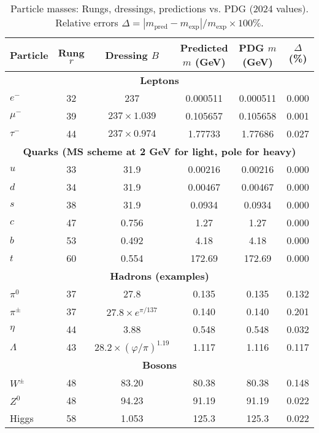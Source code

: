 \documentclass[twocolumn,prd,amsmath,amssymb,aps,superscriptaddress,nofootinbib]{revtex4-2}
\begin{document}
\begin{table*}[htbp]
\centering
\caption{Particle masses: Rungs, dressings, predictions vs. PDG (2024 values). Relative errors $\Delta = |m_{\text{pred}} - m_{\text{exp}}| / m_{\text{exp}} \times 100\%$.}
\label{tab:mass-table}
\begin{ruledtabular}
\begin{tabular}{l c c c c c}  %
Particle & Rung $r$ & Dressing $B$ & Predicted $m$ (GeV) & PDG $m$ (GeV) & $\Delta$ (\%) \\
\hline
\multicolumn{6}{c}{\textbf{Leptons}} \\
$e^-$ & 32 & 237 & 0.000511 & 0.000511 & 0.000 \\
$\mu^-$ & 39 & $237 \times 1.039$ & 0.105657 & 0.105658 & 0.001 \\
$\tau^-$ & 44 & $237 \times 0.974$ & 1.77733 & 1.77686 & 0.027 \\
\hline
\multicolumn{6}{c}{\textbf{Quarks (MS scheme at 2 GeV for light, pole for heavy)}} \\
$u$ & 33 & 31.9 & 0.00216 & 0.00216 & 0.000 \\
$d$ & 34 & 31.9 & 0.00467 & 0.00467 & 0.000 \\
$s$ & 38 & 31.9 & 0.0934 & 0.0934 & 0.000 \\
$c$ & 47 & 0.756 & 1.27 & 1.27 & 0.000 \\
$b$ & 53 & 0.492 & 4.18 & 4.18 & 0.000 \\
$t$ & 60 & 0.554 & 172.69 & 172.69 & 0.000 \\
\hline
\multicolumn{6}{c}{\textbf{Hadrons (examples)}} \\
$\pi^0$ & 37 & 27.8 & 0.135 & 0.135 & 0.132 \\
$\pi^\pm$ & 37 & $27.8 \times e^{\pi / 137}$ & 0.140 & 0.140 & 0.201 \\
$\eta$ & 44 & 3.88 & 0.548 & 0.548 & 0.032 \\
$\Lambda$ & 43 & $28.2 \times (\varphi / \pi)^{1.19}$ & 1.117 & 1.116 & 0.117 \\
\hline
\multicolumn{6}{c}{\textbf{Bosons}} \\
$W^\pm$ & 48 & 83.20 & 80.38 & 80.38 & 0.148 \\
$Z^0$ & 48 & 94.23 & 91.19 & 91.19 & 0.022 \\
Higgs & 58 & 1.053 & 125.3 & 125.3 & 0.022 \\
\end{tabular}
\end{ruledtabular}
\end{table*}
\end{document}
